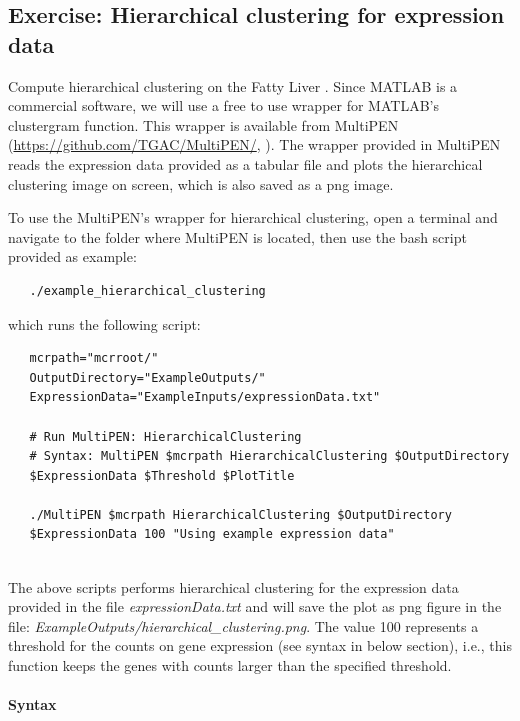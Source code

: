 \documentclass[11pt, oneside]{article}   	%
\begin{document}
\subsection{Exercise: Hierarchical clustering for expression data}

Compute hierarchical clustering on the Fatty Liver \cite{Wruck2015}.
Since MATLAB is a commercial software, we will use a free to use wrapper for MATLAB's clustergram function. This wrapper is available from MultiPEN (\url{https://github.com/TGAC/MultiPEN/}, \cite{Rey2017}). The wrapper provided in MultiPEN reads the expression data provided as a tabular file and plots the hierarchical clustering image on screen, which is also saved as a png image. 

To use the MultiPEN's wrapper for hierarchical clustering, open a terminal and navigate to the folder where MultiPEN is located, then use the bash script provided as example: 

\begin{framed}
\begin{verbatim}
   ./example_hierarchical_clustering
\end{verbatim}
\end{framed}


\noindent which runs the following script:

\begin{framed}
\begin{verbatim}
   mcrpath="mcrroot/"
   OutputDirectory="ExampleOutputs/"
   ExpressionData="ExampleInputs/expressionData.txt"

   # Run MultiPEN: HierarchicalClustering
   # Syntax: MultiPEN $mcrpath HierarchicalClustering $OutputDirectory 
   $ExpressionData $Threshold $PlotTitle

   ./MultiPEN $mcrpath HierarchicalClustering $OutputDirectory 
   $ExpressionData 100 "Using example expression data"
   
\end{verbatim}
\end{framed}

\noindent The above scripts performs hierarchical clustering for the expression data provided in the file {\it expressionData.txt} and will save the plot as png figure in the file: {\it ExampleOutputs/hierarchical\_clustering.png}. The value 100 represents a threshold for the counts on gene expression (see syntax in below section), i.e., this function keeps the genes with counts larger than the specified threshold. 


\paragraph{Syntax}
\end{document}
